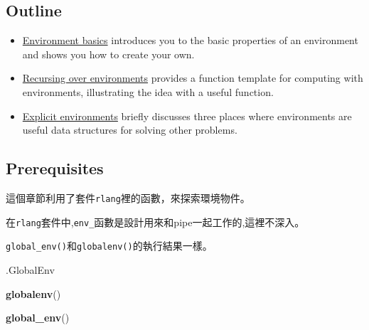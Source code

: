 \documentclass[]{book}
\newenvironment{Shaded}{\begin{snugshade}}{\end{snugshade}}
\newcommand{\KeywordTok}[1]{\textcolor[rgb]{0.13,0.29,0.53}{\textbf{#1}}}
\newcommand{\NormalTok}[1]{#1}
\theoremstyle{definition}
\theoremstyle{definition}
\theoremstyle{definition}
\theoremstyle{remark}
\begin{document}
\hypertarget{outline-1}{%
\subsection*{Outline}\label{outline-1}}

\begin{itemize}
\item
  \protect\hyperlink{env-basics}{Environment basics} introduces you to
  the basic properties of an environment and shows you how to create
  your own.
\item
  \protect\hyperlink{env-recursion}{Recursing over environments}
  provides a function template for computing with environments,
  illustrating the idea with a useful function.
\item
  \protect\hyperlink{explicit-envs}{Explicit environments} briefly
  discusses three places where environments are useful data structures
  for solving other problems.
\end{itemize}

\hypertarget{prerequisites}{%
\subsection*{Prerequisites}\label{prerequisites}}

這個章節利用了套件\texttt{rlang}裡的函數，來探索環境物件。

在\texttt{rlang}套件中,\texttt{env\_}函數是設計用來和pipe一起工作的,這裡不深入。

\texttt{global\_env()}和\texttt{globalenv()}的執行結果一樣。

\begin{Shaded}
\begin{Highlighting}[]
\NormalTok{.GlobalEnv}
\end{Highlighting}
\end{Shaded}

\begin{Shaded}
\begin{Highlighting}[]
\KeywordTok{globalenv}\NormalTok{()}
\end{Highlighting}
\end{Shaded}

\begin{Shaded}
\begin{Highlighting}[]
\KeywordTok{global_env}\NormalTok{()}
\end{Highlighting}
\end{Shaded}
\end{document}
